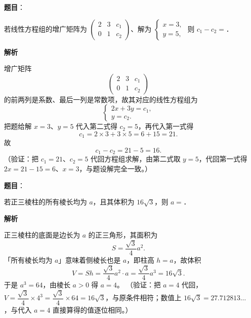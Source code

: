 \begin{answer}

\textbf{题目}：

若线性方程组的增广矩阵为 $\begin{pmatrix} 2 & 3 & c_{1}\\ 0 & 1 & c_{2} \end{pmatrix}$、解为 $\begin{cases} x=3,\\ y=5, \end{cases}$ 则 \(c_{1}-c_{2}=\)\gkblank{}．

\textbf{解析}

增广矩阵
\nopagebreak[4]
\[
\begin{pmatrix} 2 & 3 & c_{1}\\ 0 & 1 & c_{2} \end{pmatrix}
\]
的前两列是系数、最后一列是常数项，故其对应的线性方程组为
\nopagebreak[4]
\[
\begin{cases}
2x+3y=c_{1},\\
y=c_{2}.
\end{cases}
\]
把题给解 \(x=3\)、\(y=5\) 代入第二式得 \(c_{2}=5\)，再代入第一式得
\nopagebreak[4]
\[
c_{1}=2\times3+3\times5=6+15=21.
\]
故
\nopagebreak[4]
\[
c_{1}-c_{2}=21-5=16.
\]
（验证：把 \(c_{1}=21\)、\(c_{2}=5\) 代回方程组求解，由第二式取 \(y=5\)，代回第一式得 \(2x=21-15=6\)、\(x=3\)，与题设解完全一致。）


\end{answer}
\begin{answer}

\textbf{题目}：

若正三棱柱的所有棱长均为 \(a\)，且其体积为 \(16\sqrt{3}\)，则 \(a=\)\gkblank{}．

\textbf{解析}

正三棱柱的底面是边长为 \(a\) 的正三角形，其面积为
\nopagebreak[4]
\[
S=\frac{\sqrt{3}}{4}a^{2}.
\]
「所有棱长均为 \(a\)」意味着侧棱长也是 \(a\)，即柱高 \(h=a\)，故体积
\nopagebreak[4]
\[
V=Sh=\frac{\sqrt{3}}{4}a^{2}\cdot a=\frac{\sqrt{3}}{4}a^{3}=16\sqrt{3}.
\]
于是 \(a^{3}=64\)，由棱长 \(a>0\) 得 \(a=4\)。
（验证：把 \(a=4\) 代回，\(V=\dfrac{\sqrt{3}}{4}\times4^{3}=\dfrac{\sqrt{3}}{4}\times64=16\sqrt{3}\)，与原条件相符；数值上 \(16\sqrt{3}=27.712813\ldots\)，与代入 \(a=4\) 直接算得的值逐位相同。）


\end{answer}
